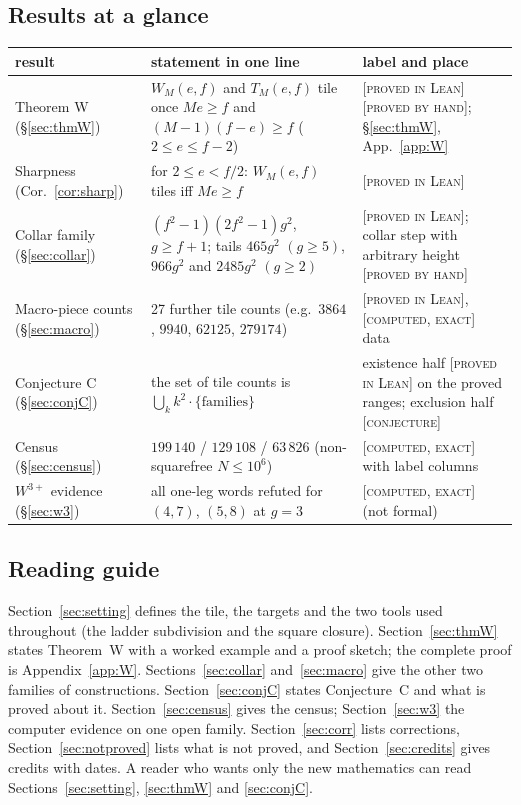 \documentclass[11pt,reqno]{amsart}
\theoremstyle{plain}
\theoremstyle{definition}
\newcommand{\lab}[1]{\textup{[\textsc{#1}]}}
\newcommand{\PL}{\lab{proved in Lean}}
\newcommand{\PH}{\lab{proved by hand}}
\newcommand{\CE}{\lab{computed, exact}}
\newcommand{\CJ}{\lab{conjecture}}
\begin{document}
\subsection{Results at a glance}
\begin{center}
\small
\begin{tabular}{@{}p{3.1cm}p{6.2cm}p{3.5cm}@{}}
\toprule
result & statement in one line & label and place\\
\midrule
Theorem W (\S\ref{sec:thmW}) & $W_M(e,f)$ and $T_M(e,f)$ tile once $Me\ge f$ and $(M-1)(f-e)\ge f$ ($2\le e\le f-2$) & \PL{} \PH{}; \S\ref{sec:thmW}, App.~\ref{app:W}\\
Sharpness (Cor.~\ref{cor:sharp}) & for $2\le e<f/2$: $W_M(e,f)$ tiles iff $Me\ge f$ & \PL{}\\
Collar family (\S\ref{sec:collar}) & $(f^2-1)(2f^2-1)g^2$, $g\ge f+1$; tails $465g^2$ $(g\ge5)$, $966g^2$ and $2485g^2$ $(g\ge2)$ & \PL{}; collar step with arbitrary height \PH{}\\
Macro-piece counts (\S\ref{sec:macro}) & 27 further tile counts (e.g.\ $3864$, $9940$, $62125$, $279174$) & \PL{}, \CE{} data\\
Conjecture C (\S\ref{sec:conjC}) & the set of tile counts is $\bigcup_k k^2\cdot\{\text{families}\}$ & existence half \PL{} on the proved ranges; exclusion half \CJ{}\\
Census (\S\ref{sec:census}) & $199\,140$ / $129\,108$ / $63\,826$ (non-squarefree $N\le10^6$) & \CE{} with label columns\\
$W^{3+}$ evidence (\S\ref{sec:w3}) & all one-leg words refuted for $(4,7)$, $(5,8)$ at $g=3$ & \CE{} (not formal)\\
\bottomrule
\end{tabular}
\end{center}

\subsection{Reading guide}
Section~\ref{sec:setting} defines the tile, the targets and the two tools used throughout (the ladder subdivision and the square closure).
Section~\ref{sec:thmW} states Theorem~W with a worked example and a proof sketch; the complete proof is Appendix~\ref{app:W}.
Sections~\ref{sec:collar} and~\ref{sec:macro} give the other two families of constructions.
Section~\ref{sec:conjC} states Conjecture~C and what is proved about it.
Section~\ref{sec:census} gives the census; Section~\ref{sec:w3} the computer evidence on one open family.
Section~\ref{sec:corr} lists corrections, Section~\ref{sec:notproved} lists what is not proved, and Section~\ref{sec:credits} gives credits with dates.
A reader who wants only the new mathematics can read Sections~\ref{sec:setting}, \ref{sec:thmW} and \ref{sec:conjC}.
\end{document}
